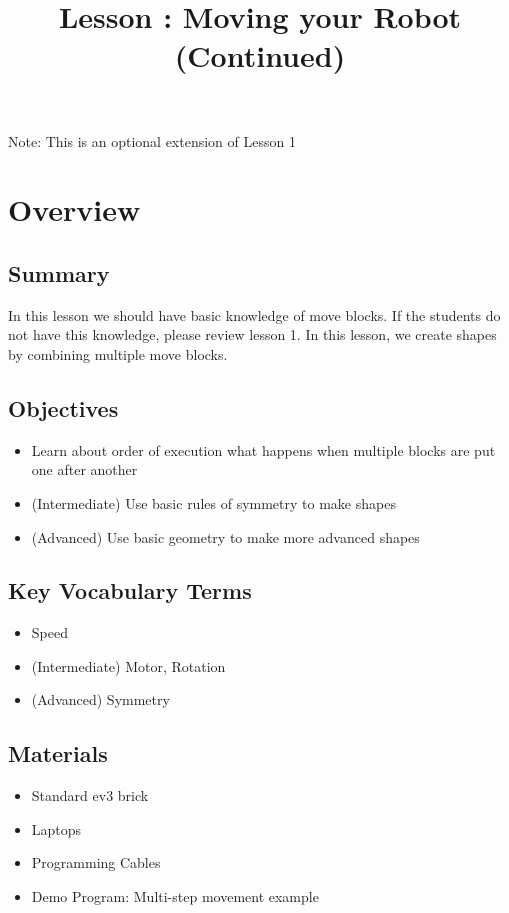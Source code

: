 \documentclass{lessonplan}
\title{Lesson \lessonNumber: Moving your Robot (Continued)}
\author{\linkHome}
\date{}
\begin{document}
  \maketitle
  \begin{center}
        Note: This is an optional extension of Lesson 1
  \end{center}

  \section{Overview}
    \subsection{Summary}
      In this lesson we should have basic knowledge of move blocks. If the students do not have this knowledge, please review lesson 1. In this lesson, we create shapes by combining multiple move blocks.
    \subsection{Objectives}
    \begin{itemize}
      \item Learn about order of execution what happens when multiple blocks are put one after another
      \item (Intermediate) Use basic rules of symmetry to make shapes
      \item (Advanced) Use basic geometry to make more advanced shapes
    \end{itemize}
    \subsection{Key Vocabulary Terms}
    \begin{itemize}
      \item Speed
      \item (Intermediate) Motor, Rotation
        \item (Advanced) Symmetry

    \end{itemize}
    \subsection{Materials}
      \begin{itemize}
        \item Standard ev3 brick
        \item Laptops
        \item Programming Cables
        \item Demo Program: Multi-step movement example
      \end{itemize}
      
\end{document}
